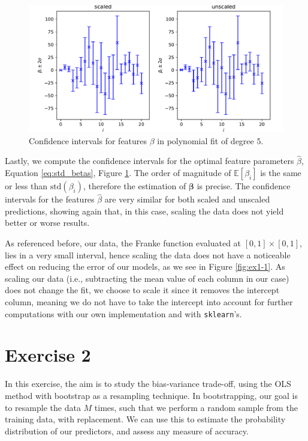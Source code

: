 \documentclass[10pt, a4paper]{article}
\begin{document}
    \begin{figure}[h]
        \centering
        \includegraphics[scale=0.5]{ex1_cnf_intv_betas_n_600_noise_0.25.pdf}
        \caption{Confidence intervals for features $\beta$ in polynomial fit of degree $5$.}
        \label{fig:ex1-2}
    \end{figure}
    
    Lastly, we compute the confidence intervals for the optimal feature parameters $\hat{\beta}$, Equation \eqref{eq:std_betas}, Figure \ref{fig:ex1-2}. The order of magnitude of $\mathbb{E}[\beta_i]$ is the same or less than $\text{std}(\beta_i)$, therefore the estimation of $\bm{\beta}$ is precise. The confidence intervals for the features $\hat{\beta}$ are very similar for both scaled and unscaled predictions, showing again that, in this case, scaling the data does not yield better or worse results.
    
    As referenced before, our data, the Franke function evaluated at $[0,1]\times[0,1]$, lies in a very small interval, hence scaling the data does not have a noticeable effect on reducing the error of our models, as we see in Figure \ref{fig:ex1-1}. As scaling our data (i.e., subtracting the mean value of each column in our case) does not change the fit, we choose to scale it since it removes the intercept column, meaning we do not have to take the intercept into account for further computations with our own implementation and with \texttt{sklearn}'s.

\section*{Exercise 2}

    In this exercise, the aim is to study the bias-variance trade-off, using the OLS method with bootstrap as a resampling technique. In bootstrapping, our goal is to resample the data $M$ times, such that we perform a random sample from the training data, with replacement. We can use this to estimate the probability distribution of our predictors, and assess any measure of accuracy.
    
\end{document}
